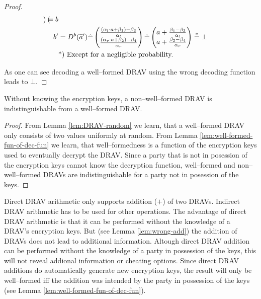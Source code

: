 \begin{proof}
\begin{align*}
\begin{pmatrix}
    \end{pmatrix}
    = b\\
    b' &= D^b(\widetilde{a}')
    \hat{=}
    \begin{pmatrix}
      \frac{(\alpha_l \cdot a + \beta_1) - \beta_3}{\alpha_l}\\
      \frac{(\alpha_r \cdot a + \beta_2) - \beta_4}{\alpha_r}\\
    \end{pmatrix}
    \hat{=}
    \begin{pmatrix}
      a +
      \frac{\beta_1 - \beta_3}{\alpha_l}\\
      a +
      \frac{\beta_2 - \beta_4}{\alpha_r}\\
    \end{pmatrix}
    \stackrel{*}{=} \bot\\
    &\text{*) Except for a negligible probability.}{}
  \end{align*}

  \noindent{}As one can see decoding a well--formed DRAV using the wrong
  decoding function leads to $\bot$.

\end{proof}


\begin{lem}
  \label{lem:DRAV-indistinguishable}

  Without knowing the encryption keys, a non--well--formed DRAV is
  indistinguishable from a well--formed DRAV.

\end{lem}
\begin{proof}

  From Lemma \ref{lem:DRAV-random} we learn, that a well--formed DRAV only
  consists of two values uniformly at random. From Lemma
  \ref{lem:well-formed-fun-of-dec-fun} we learn, that well--formedness is a
  function of the encryption keys used to eventually decrypt the DRAV. Since a
  party that is not in posession of the encryption keys cannot know the
  decryption function, well--formed and non--well--formed DRAVs are
  indistinguishable for a party not in posession of the keys.
\end{proof}


\label{sec:direct-DRAV-arithmetic}

Direct DRAV arithmetic only supports addition ($+$) of two DRAVs. Indirect DRAV
arithmetic has to be used for other operations. The advantage of direct DRAV
arithmetic is that it can be performed without the knowledge of a DRAV's
encryption keys. But (see Lemma \ref{lem:wrong-add}) the addition of DRAVs does
not lead to additional information. Altough direct DRAV addition can be
performed without the knowledge of a party in possession of the keys, this will
not reveal addional information or cheating options. Since direct DRAV
additions do automatically generate new encryption keys, the result will only be
well--formed iff the addition was intended by the party in possession of the
keys (see Lemma \ref{lem:well-formed-fun-of-dec-fun}).


